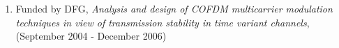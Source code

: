 \begin{enumerate}
    \item Funded by DFG, \emph {Analysis and design of COFDM multicarrier modulation techniques in view
          of transmission stability in time variant channels}, (September 2004 - December
          2006)
\end{enumerate}

%
%





%
%

%
